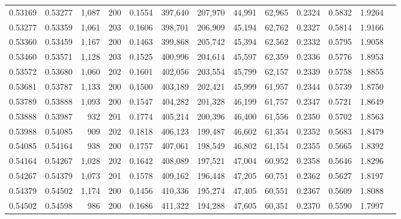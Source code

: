 \begin{tabular}{rrrrrrrrrrrrr}
0.53169 & 0.53277 & 1,087 & 200 &                                     0.1554 & 397,640 & 207,970 &  44,991 &  62,965 & 0.2324 & 0.5832 & 1.9264 \\
0.53277 & 0.53359 & 1,061 & 203 &                                     0.1606 & 398,701 & 206,909 &  45,194 &  62,762 & 0.2327 & 0.5814 & 1.9166 \\
0.53360 & 0.53459 & 1,167 & 200 &                                     0.1463 & 399,868 & 205,742 &  45,394 &  62,562 & 0.2332 & 0.5795 & 1.9058 \\
0.53460 & 0.53571 & 1,128 & 203 &                                     0.1525 & 400,996 & 204,614 &  45,597 &  62,359 & 0.2336 & 0.5776 & 1.8953 \\
0.53572 & 0.53680 & 1,060 & 202 &                                     0.1601 & 402,056 & 203,554 &  45,799 &  62,157 & 0.2339 & 0.5758 & 1.8855 \\
0.53681 & 0.53787 & 1,133 & 200 &                                     0.1500 & 403,189 & 202,421 &  45,999 &  61,957 & 0.2344 & 0.5739 & 1.8750 \\
0.53789 & 0.53888 & 1,093 & 200 &                                     0.1547 & 404,282 & 201,328 &  46,199 &  61,757 & 0.2347 & 0.5721 & 1.8649 \\
0.53888 & 0.53987 &   932 & 201 &                                     0.1774 & 405,214 & 200,396 &  46,400 &  61,556 & 0.2350 & 0.5702 & 1.8563 \\
0.53988 & 0.54085 &   909 & 202 &                                     0.1818 & 406,123 & 199,487 &  46,602 &  61,354 & 0.2352 & 0.5683 & 1.8479 \\
0.54085 & 0.54164 &   938 & 200 &                                     0.1757 & 407,061 & 198,549 &  46,802 &  61,154 & 0.2355 & 0.5665 & 1.8392 \\
0.54164 & 0.54267 & 1,028 & 202 &                                     0.1642 & 408,089 & 197,521 &  47,004 &  60,952 & 0.2358 & 0.5646 & 1.8296 \\
0.54267 & 0.54379 & 1,073 & 201 &                                     0.1578 & 409,162 & 196,448 &  47,205 &  60,751 & 0.2362 & 0.5627 & 1.8197 \\
0.54379 & 0.54502 & 1,174 & 200 &                                     0.1456 & 410,336 & 195,274 &  47,405 &  60,551 & 0.2367 & 0.5609 & 1.8088 \\
0.54502 & 0.54598 &   986 & 200 &                                     0.1686 & 411,322 & 194,288 &  47,605 &  60,351 & 0.2370 & 0.5590 & 1.7997 \\

\end{tabular}

